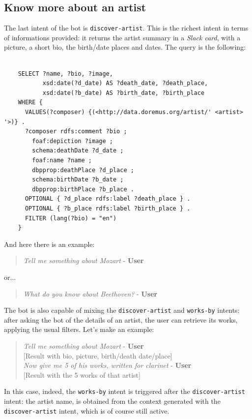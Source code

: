\documentclass[a4paper,12pt]{report}
\begin{document}
	\subsection{Know more about an artist}
	The last intent of the bot is \texttt{discover-artist}. This is the richest intent in terms of informations provided: it returns the artist summary in a \textit{Slack card}, with a picture, a short bio, the birth/date places and dates.
	The query is the following:
	\begin{lstlisting}
	
	SELECT ?name, ?bio, ?image,
	       xsd:date(?d_date) AS ?death_date, ?death_place,
	       xsd:date(?b_date) AS ?birth_date, ?birth_place
	WHERE {
	  VALUES(?composer) {(<http://data.doremus.org/artist/' <artist> '>)} .
	  ?composer rdfs:comment ?bio ;
	    foaf:depiction ?image ;
	    schema:deathDate ?d_date ;
	    foaf:name ?name ;
	    dbpprop:deathPlace ?d_place ;
	    schema:birthDate ?b_date ;
	    dbpprop:birthPlace ?b_place .
	  OPTIONAL { ?d_place rdfs:label ?death_place } .
	  OPTIONAL { ?b_place rdfs:label ?birth_place } .
	  FILTER (lang(?bio) = "en")
	}
	\end{lstlisting}
	And here there is an example:
	\begin{verse}
		\textit{Tell me something about Mozart} - \textbf{User}\\
	\end{verse}
	or...
	\begin{verse}
		\textit{What do you know about Beethoven?} - \textbf{User}\\
	\end{verse}
	The bot is also capable of mixing the \texttt{discover-artist} and \texttt{works-by} intents:
	after asking the bot of the details of an artist, the user can retrieve its works, applying the usual filters. Let's make an example:
	
	\begin{verse}
		\textit{Tell me something about Mozart} - \textbf{User}\\
		{[Result with bio, picture, birth/death date/place]}\\
		\textit{Now give me 5 of his works, written for clarinet} - \textbf{User}\\
		{[Result with the 5 works of that artist]}\\
	\end{verse}
	In this case, indeed, the \texttt{works-by} intent is triggered after the \texttt{discover-artist} intent: the artist name, is obtained from the context generated with the \texttt{discover-artist} intent, which is of course still active.
\end{document}
